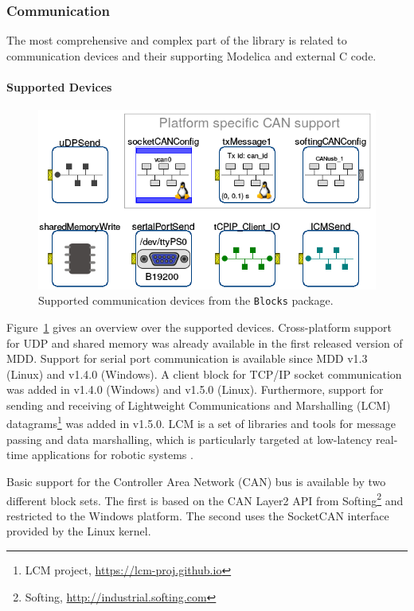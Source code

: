 \documentclass{resources/modelica}
\newcommand{\modelica}[1]{\lstinline[language=modelica]|#1|}
\begin{document}
\subsubsection{Communication}

The most comprehensive and complex part of the library is related to
communication devices and their supporting Modelica and external C code.

\paragraph{Supported Devices}

\begin{figure}[htb]
  \centering
  \includegraphics[width=0.9\columnwidth]{figures/OverviewCommunicationDevices}
  \caption{Supported communication devices from the \modelica{Blocks} package.}
  \label{fig:OverviewCommunicationDevices}
\end{figure}


Figure~\ref{fig:OverviewCommunicationDevices} gives an overview over the
supported devices. Cross-platform support for UDP and shared memory was already
available in the first released version of MDD. Support for serial port communication is
available since MDD v1.3 (Linux) and v1.4.0 (Windows). A client block for TCP/IP
socket communication was added in v1.4.0 (Windows) and v1.5.0 (Linux).
Furthermore, support for sending and receiving of Lightweight Communications and
Marshalling (LCM) datagrams\footnote{LCM project,
\url{https://lcm-proj.github.io}} was added in v1.5.0.
LCM is a set of libraries and tools for message passing and data marshalling,
which is particularly targeted at low-latency real-time applications for
robotic systems \citep{Huang2010}.

Basic support for the Controller Area Network (CAN) bus is available by two
different block sets. The first is based on the CAN Layer2 API from
Softing\footnote{Softing, \url{http://industrial.softing.com}} and restricted to the
Windows platform. The second uses the SocketCAN
interface provided by the Linux kernel.
\end{document}
